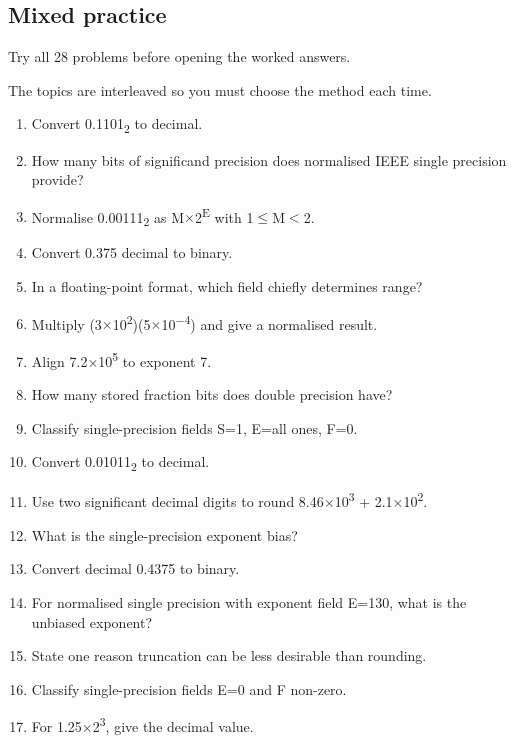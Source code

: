 \documentclass[11pt]{article}
\begin{document}
\begin{keepsection}
\section{Mixed practice}

Try all 28 problems before opening the worked answers.

The topics are interleaved so you must choose the method each time.

\begin{enumerate}
\item Convert 0.1101\textsubscript{2} to decimal.
\item How many bits of significand precision does normalised IEEE single precision provide?
\item Normalise 0.00111\textsubscript{2} as M\ensuremath{\times}2\textsuperscript{E} with 1\ensuremath{\leq}M\ensuremath{<}2.
\item Convert 0.375 decimal to binary.
\item In a floating-point format, which field chiefly determines range?
\item Multiply (3\ensuremath{\times}10\textsuperscript{2})(5\ensuremath{\times}10\textsuperscript{\ensuremath{-}4}) and give a normalised result.
\item Align 7.2\ensuremath{\times}10\textsuperscript{5} to exponent 7.
\item How many stored fraction bits does double precision have?
\item Classify single-precision fields S=1, E=all ones, F=0.
\item Convert 0.01011\textsubscript{2} to decimal.
\item Use two significant decimal digits to round 8.46\ensuremath{\times}10\textsuperscript{3} + 2.1\ensuremath{\times}10\textsuperscript{2}.
\item What is the single-precision exponent bias?
\item Convert decimal 0.4375 to binary.
\item For normalised single precision with exponent field E=130, what is the unbiased exponent?
\item State one reason truncation can be less desirable than rounding.
\item Classify single-precision fields E=0 and F non-zero.
\item For 1.25\ensuremath{\times}2\textsuperscript{3}, give the decimal value.

\end{enumerate}
\end{keepsection}
\end{document}

